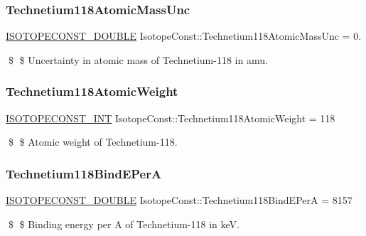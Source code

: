 \subsubsection{\texorpdfstring{Technetium118\+Atomic\+Mass\+Unc}{Technetium118AtomicMassUnc}}
{\footnotesize\ttfamily \mbox{\hyperlink{group___isotope_const-_macros_ga8f45a7272ce02c0b4c65c44636ed719a}{I\+S\+O\+T\+O\+P\+E\+C\+O\+N\+S\+T\+\_\+\+D\+O\+U\+B\+LE}} Isotope\+Const\+::\+Technetium118\+Atomic\+Mass\+Unc = 0.}

\$ \$ Uncertainty in atomic mass of Technetium-\/118 in amu. \mbox{\label{group___isotope_const-_technetium-_tc118_ga5d84f42db122c7efc8bf395c7ab3078d}} 
\subsubsection{\texorpdfstring{Technetium118\+Atomic\+Weight}{Technetium118AtomicWeight}}
{\footnotesize\ttfamily \mbox{\hyperlink{group___isotope_const-_macros_ga5f18360b3e99483a35c32d789e62621c}{I\+S\+O\+T\+O\+P\+E\+C\+O\+N\+S\+T\+\_\+\+I\+NT}} Isotope\+Const\+::\+Technetium118\+Atomic\+Weight = 118}

\$ \$ Atomic weight of Technetium-\/118. \mbox{\label{group___isotope_const-_technetium-_tc118_ga1df6310a7d9c0cc58110d19ef54b23f3}} 
\subsubsection{\texorpdfstring{Technetium118\+Bind\+E\+PerA}{Technetium118BindEPerA}}
{\footnotesize\ttfamily \mbox{\hyperlink{group___isotope_const-_macros_ga8f45a7272ce02c0b4c65c44636ed719a}{I\+S\+O\+T\+O\+P\+E\+C\+O\+N\+S\+T\+\_\+\+D\+O\+U\+B\+LE}} Isotope\+Const\+::\+Technetium118\+Bind\+E\+PerA = 8157}

\$ \$ Binding energy per A of Technetium-\/118 in keV. \mbox{\label{group___isotope_const-_technetium-_tc118_gad287bb0486e96eb1d87b8e07e6eed192}} 
